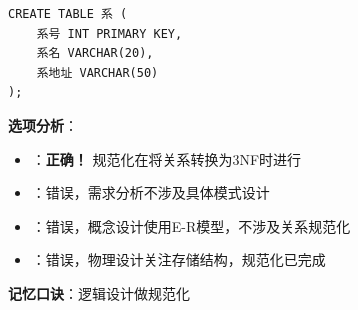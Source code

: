 \documentclass[12pt, a4paper]{article}
\newenvironment{bluebox}[1]{%
  \begin{trivlist}
  \item[\hskip\labelsep \textbf{#1}]
  \setlength{\parskip}{0.5ex}
  \setlength{\itemsep}{0.5ex}
}{%
  \end{trivlist}
  }
\begin{document}
\begin{bluebox}{例题8：规范化阶段}
\begin{verbatim}
CREATE TABLE 系 (
    系号 INT PRIMARY KEY,
    系名 VARCHAR(20),
    系地址 VARCHAR(50)
);
	\end{verbatim}

	\textbf{选项分析}：
	\begin{itemize}[nosep]
		\item[A) 逻辑结构设计阶段]：\textbf{正确！} 规范化在将关系转换为3NF时进行
		\item[B) 需求分析阶段]：错误，需求分析不涉及具体模式设计
		\item[C) 概念结构设计阶段]：错误，概念设计使用E-R模型，不涉及关系规范化
		\item[D) 物理结构设计阶段]：错误，物理设计关注存储结构，规范化已完成
	\end{itemize}

	\textbf{记忆口诀}：逻辑设计做规范化
\end{bluebox}
\end{document}
